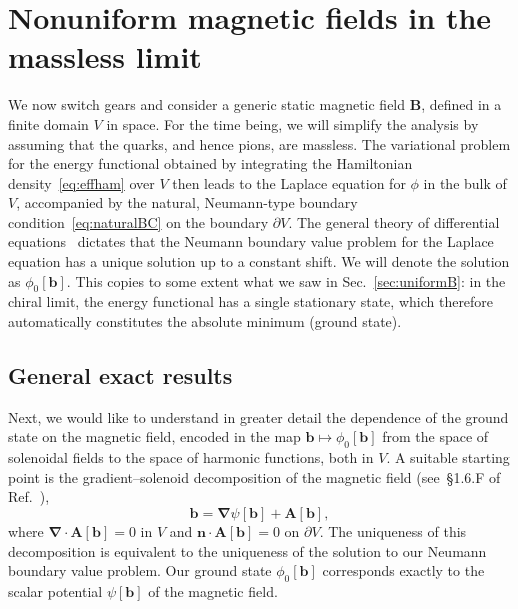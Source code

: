 \documentclass[pdflatex,iicol,sn-mathphys-num]{sn-jnl}
\let\p=\phi
\let\de=\partial
\newcommand{\vek}[1]{\bm{#1}}%
\newcommand{\grad}{\vek\nabla}%
\newcommand{\divg}{\grad\cdot}%
\newcommand{\bmag}{b}%
\begin{document}

\section{Nonuniform magnetic fields in the massless limit}
\label{sec:nonuniformBzeroM}

We now switch gears and consider a generic static magnetic field $\vek B$, defined in a finite domain $V$ in space. For the time being, we will simplify the analysis by assuming that the quarks, and hence pions, are massless. The variational problem for the energy functional obtained by integrating the Hamiltonian density~\eqref{eq:effham} over $V$ then leads to the Laplace equation for $\p$ in the bulk of $V$, accompanied by the natural, Neumann-type boundary condition~\eqref{eq:naturalBC} on the boundary $\de V$. The general theory of differential equations~\cite{Arnold2004} dictates that the Neumann boundary value problem for the Laplace equation has a unique solution up to a constant shift. We will denote the solution as $\p_0[\vek\bmag]$. This copies to some extent what we saw in Sec.~\ref{sec:uniformB}: in the chiral limit, the energy functional has a single stationary state, which therefore automatically constitutes the absolute minimum (ground state).


\subsection{General exact results}
\label{subsec:nonuniformBzeroMgeneral}

Next, we would like to understand in greater detail the dependence of the ground state on the magnetic field, encoded in the map $\vek\bmag\mapsto\p_0[\vek\bmag]$ from the space of solenoidal fields to the space of harmonic functions, both in $V$. A suitable starting point is the gradient--solenoid decomposition of the magnetic field (see~\S 1.6.F of Ref.~\cite{Gallavotti2002}),
\begin{equation}
\vek\bmag=\grad\psi[\vek\bmag]+\vek A[\vek\bmag],
\label{eq:helmholtz}
\end{equation}
where $\divg\vek A[\vek\bmag]=0$ in $V$ and $\vek n\cdot\vek A[\vek\bmag]=0$ on $\de V$. The uniqueness of this decomposition is equivalent to the uniqueness of the solution to our Neumann boundary value problem. Our ground state $\p_0[\vek\bmag]$ corresponds exactly to the scalar potential $\psi[\vek\bmag]$ of the magnetic field.
\end{document}
